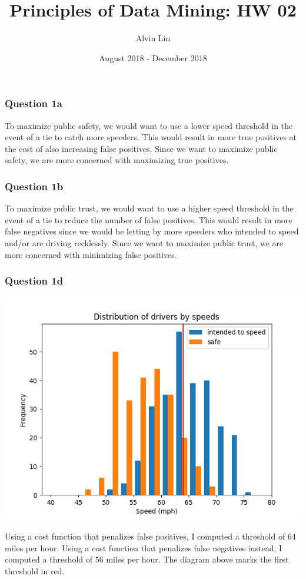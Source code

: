 \documentclass{math}
\title{Principles of Data Mining: HW 02}
\author{Alvin Lin}
\date{August 2018 - December 2018}
\begin{document}
\maketitle

\subsubsection*{Question 1a}
To maximize public safety, we would want to use a lower speed threshold in the
event of a tie to catch more speeders. This would result in more true positives
at the cost of also increasing false positives. Since we want to maximize
public safety, we are more concerned with maximizing true positives.

\subsubsection*{Question 1b}
To maximize public trust, we would want to use a higher speed threshold in the
event of a tie to reduce the number of false positives. This would result in
more false negatives since we would be letting by more speeders who intended to
speed and/or are driving recklessly. Since we want to maximize public trust, we
are more concerned with minimizing false positives.

\subsubsection*{Question 1d}
\begin{center}
  \includegraphics[width=16cm]{assets/hw_02_speed_histogram.png}
\end{center}
Using a cost function that penalizes false positives, I computed a threshold of
64 miles per hour. Using a cost function that penalizes false negatives instead,
I computed a threshold of 56 miles per hour. The diagram above marks the first
threshold in red.
\end{document}
